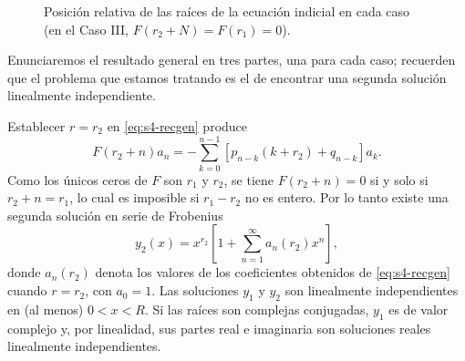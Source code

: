 \begin{figure}[H]
\centering
{}
\caption{Posición relativa de las raíces de la ecuación indicial en cada caso (en el Caso III, $F(r_2+N)=F(r_1)=0$).}
\label{fig:s4-raices}
\end{figure}
 
Enunciaremos el resultado general en tres partes, una para cada caso; recuerden que el problema que estamos tratando es el de encontrar una segunda solución linealmente independiente.
 
\begin{theorem}\label{thm:s4-I}
Establecer $r = r_2$ en \eqref{eq:s4-recgen} produce
\[ F(r_2 + n)a_n = -\sum_{k=0}^{n-1} [p_{n-k}(k + r_2) + q_{n-k}] a_k. \]
Como los únicos ceros de $F$ son $r_1$ y $r_2$, se tiene $F(r_2+n)=0$ si y solo si $r_2+n=r_1$, lo cual es imposible si $r_1-r_2$ no es entero. Por lo tanto existe una segunda solución en serie de Frobenius
\[ y_2(x) = x^{r_2} \left[ 1 + \sum_{n=1}^{\infty} a_n(r_2)x^n \right], \]
donde $a_n(r_2)$ denota los valores de los coeficientes obtenidos de \eqref{eq:s4-recgen} cuando $r = r_2$, con $a_0=1$. Las soluciones $y_1$ y $y_2$ son linealmente independientes en (al menos) $0 < x < R$. Si las raíces son complejas conjugadas, $y_1$ es de valor complejo y, por linealidad, sus partes real e imaginaria son soluciones reales linealmente independientes.
\end{theorem}
 
